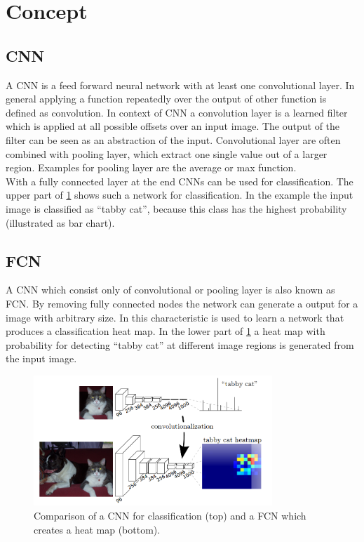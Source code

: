 \section{Concept}\label{sec:concept}
\subsection{CNN}
A \gls{CNN} is a feed forward neural network with at least one convolutional layer. In general applying a function repeatedly  over the output of other function is defined as convolution. In context of \gls{CNN} a convolution layer is a learned filter which is applied at all possible offsets over an input image. The output of the filter can be seen as an abstraction of the input. Convolutional layer are often combined with pooling layer, which extract one single value out of a larger region. Examples for pooling layer are the average or max function.\\
With a fully connected layer at the end \gls{CNN}s can be used for
classification. The upper part of \cref{fig:fcn} shows such a network for
classification. In the example the input image is classified as \enquote{tabby
cat}, because this class has the highest probability (illustrated as bar
chart).

\subsection{FCN}
A \gls{CNN} which consist only of convolutional or pooling layer is also known
as \gls{FCN}. By removing fully connected nodes the network can generate a
output for a image with arbitrary size. In \cite{long2014fully} this
characteristic is used to learn a network that produces a classification heat
map. In the lower part of \cref{fig:fcn} a heat map with probability for
detecting \enquote{tabby cat} at different image regions is generated from the
input image.

\begin{figure}[htb]
    \centering
    \includegraphics[width=9cm]{figures/fcnn}
    \caption{Comparison of a \gls{CNN} for classification (top) and a \gls{FCN} which creates a heat map (bottom). \cite{long2014fully}}
    \label{fig:fcn}
\end{figure}

